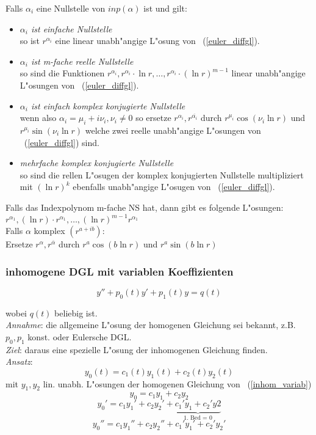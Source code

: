 \documentclass[10pt, a4paper, twocolumn]{scrartcl}
\begin{document}
Falls $\alpha_i$ eine Nullstelle von $inp(\alpha)$ ist und gilt:
\begin{itemize}
 \item \textit{$\alpha_i$ ist einfache Nullstelle}\\
  so ist $r^{\alpha_i}$ eine linear unabh"angige L"osung von ~(\ref{euler_diffgl}).
 \item \textit{$\alpha_i$ ist m-fache reelle Nullstelle}\\
  so sind die Funktionen $r^{\alpha_i},r^{\alpha_i}\cdotp\ln r,\ldots,r^{\alpha_i}\cdotp(\ln r)^{m-1}$ linear unabh"angige L"osungen von ~(\ref{euler_diffgl}).
 \item \textit{$\alpha_i$ ist einfach komplex konjugierte Nullstelle}\\
  wenn also $\alpha_i=\mu_i + i\nu_i, \nu_i\neq 0$ so ersetze $r^{\alpha_i}, r^{\overline{\alpha_i}}$ durch $r^{\mu_i}\cos(\nu_i\ln r)$ und $r^{\mu_i}\sin(\nu_i \ln r)$ welche zwei reelle unabh"angige L"osungen von ~(\ref{euler_diffgl}) sind.\\
 \item \textit{mehrfache komplex konjugierte Nullstelle}\\
  so sind die rellen L"osugen der komplex konjugierten Nullstelle multipliziert mit $(\ln r)^k$ ebenfalls unabh"angige L"osugen von ~(\ref{euler_diffgl}).
\end{itemize}

Falls das Indexpolynom m-fache NS hat, dann gibt es folgende L"osungen:\\
$r^{\alpha_1},(\ln r)\cdotp r^{\alpha_1},\ldots,(\ln r)^{m-1}r^{\alpha_1}$\\

Falls $\alpha$ komplex $(r^{a+ib})$:\\
Ersetze $r^\alpha, r^{\overline{\alpha}}$ durch $r^a\cos(b\ln r)$ und $r^a\sin(b \ln r)$

\subsubsection{inhomogene DGL mit variablen Koeffizienten}

\begin{equation}
 \label{inhom_variab}
 y''+p_0(t)y'+p_1(t)y=q(t)
\end{equation}

wobei $q(t)$ beliebig ist.\\

\textit{Annahme}: die allgemeine L"osung der homogenen Gleichung sei bekannt, z.B. $p_0,p_1$ konst. oder Eulersche DGL.\\
\textit{Ziel}: daraus eine spezielle L"osung der inhomogenen Gleichung finden.\\
\textit{Ansatz}:
$$y_0(t)=c_1(t)y_1(t)+c_2(t)y_2(t)$$
mit $y_1,y_2$ lin. unabh. L"osungen der homogenen Gleichung von ~(\ref{inhom_variab})
$$y_0=c_1y_1+c_2y_2$$
$$y_0'=c_1y_1'+c_2y_2'+\underbrace{c_1'y_1+c_2'y2}_{\mbox{1. Bed = 0}}$$
$$y_0''=c_1y_1''+c_2y_2''+c_1'y_1'+c_2'y_2'$$
\end{document}
